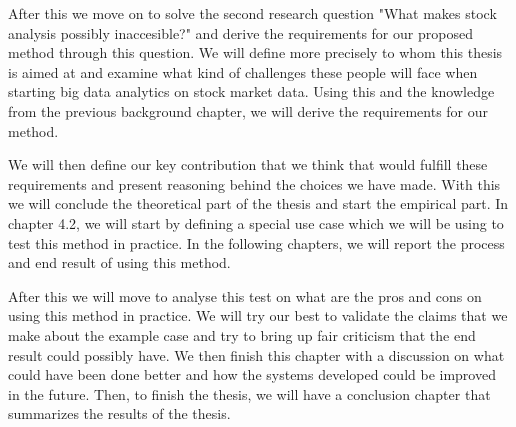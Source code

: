 After this we move on to solve the second research question "What makes stock analysis possibly inaccesible?" and derive the requirements for our proposed method through this question.
We will define more precisely to whom this thesis is aimed at and examine what kind of challenges these people will face when starting big data analytics on stock market data.
Using this and the knowledge from the previous background chapter, we will derive the requirements for our method.

We will then define our key contribution that we think that would fulfill these requirements and present reasoning behind the choices we have made.
With this we will conclude the theoretical part of the thesis and start the empirical part.
In chapter 4.2, we will start by defining a special use case which we will be using to test this method in practice.
In the following chapters, we will report the process and end result of using this method.

After this we will move to analyse this test on what are the pros and cons on using this method in practice.
We will try our best to validate the claims that we make about the example case and try to bring up fair criticism that the end result could possibly have.
We then finish this chapter with a discussion on what could have been done better and how the systems developed could be improved in the future.
Then, to finish the thesis, we will have a conclusion chapter that summarizes the results of the thesis.




